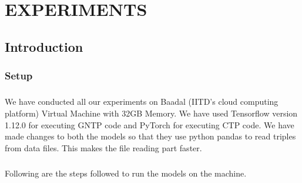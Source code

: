 \documentclass[Other]{iitddiss}
\begin{document}


\chapter{EXPERIMENTS}
\section{Introduction}
\subsection{Setup}
\paragraph{}
We have conducted all our experiments on Baadal (IITD’s cloud computing platform) Virtual Machine with 32GB Memory. We have used Tensorflow version 1.12.0 for executing GNTP code and PyTorch for executing CTP code. We have made changes to both the models so that they use python pandas to read triples from data files. This makes the file reading part faster.

\paragraph{}
Following are the steps followed to run the models on the machine.
\end{document}
